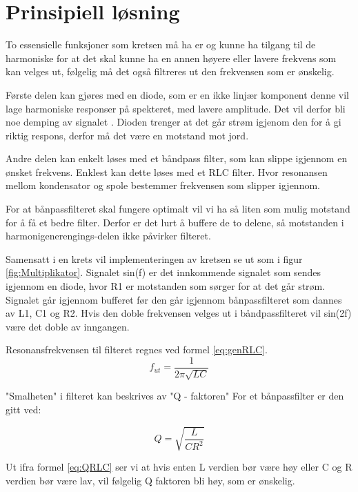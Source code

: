 \documentclass[a4paper,11pt,norsk]{article}
\begin{document}
\section{Prinsipiell løsning}
\label{sec:prinsipielllosning}

To essensielle funksjoner som kretsen må ha er og kunne ha tilgang til de harmoniske for at det skal kunne ha en annen høyere eller lavere frekvens som kan velges ut, følgelig må det også filtreres ut den frekvensen som er ønskelig.

Første delen kan gjøres med en diode, som er en ikke linjær komponent denne vil lage harmoniske responser på spekteret, med lavere amplitude. Det vil derfor bli noe demping av signalet \cite{TenkniskNotat}. Dioden trenger at det går strøm igjenom den for å gi riktig respons, derfor må det være en motstand mot jord.

Andre delen kan enkelt løses med et båndpass filter, som kan slippe igjennom en ønsket frekvens. Enklest kan dette løses med et RLC filter. Hvor resonansen mellom kondensator og spole bestemmer frekvensen som slipper igjennom.

For at bånpassfilteret skal fungere optimalt vil vi ha så liten som mulig motstand for å få et bedre filter. Derfor er det lurt å buffere de to delene, så motstanden i harmonigenerengings-delen ikke påvirker filteret. 

Samensatt i en krets vil implementeringen av kretsen se ut som i figur \ref{fig:Multiplikator}. Signalet sin(f) er det innkommende signalet som sendes igjennom en diode, hvor R1 er motstanden som sørger for at det går strøm. Signalet går igjennom bufferet før den går igjennom bånpassfilteret som dannes av L1, C1 og R2. Hvis den doble frekvensen velges ut i båndpassfilteret vil sin(2f) være det doble av inngangen. 

Resonansfrekvensen til filteret regnes ved formel \ref{eq:genRLC}.
\begin{equation}
  \label{eq:genRLC}
  f_{ut}=\frac{1}{2\pi\sqrt{LC}}
 \end{equation}
 
 "Smalheten" i filteret kan beskrives av "Q - faktoren" \cite{TenkniskNotat} For et bånpassfilter er den gitt ved: 
 
 \begin{equation}
  \label{eq:QRLC}
  Q=\sqrt{\frac{L}{CR^2}}
 \end{equation}
 
 Ut ifra formel \ref{eq:QRLC} ser vi at hvis enten L verdien bør være høy eller C og R verdien bør være lav, vil følgelig Q faktoren bli høy, som er ønskelig.
\end{document}
